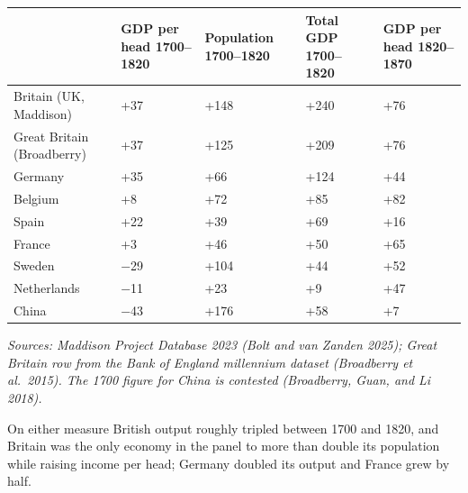 \documentclass[
  11pt,
]{article}
\newcounter{none} %
\begin{document}
{\def\LTcaptype{none} %
\begin{longtable}[]{@{}
  >{\raggedright\arraybackslash}p{}
  >{\raggedleft\arraybackslash}p{}
  >{\raggedleft\arraybackslash}p{}
  >{\raggedleft\arraybackslash}p{}
  >{\raggedleft\arraybackslash}p{}@{}}
\toprule\noalign{}
\begin{minipage}[b]{\linewidth}\raggedright
\end{minipage} & \begin{minipage}[b]{\linewidth}\raggedleft
GDP per head 1700--1820
\end{minipage} & \begin{minipage}[b]{\linewidth}\raggedleft
Population 1700--1820
\end{minipage} & \begin{minipage}[b]{\linewidth}\raggedleft
Total GDP 1700--1820
\end{minipage} & \begin{minipage}[b]{\linewidth}\raggedleft
GDP per head 1820--1870
\end{minipage} \\
\midrule\noalign{}
\endhead
\bottomrule\noalign{}
\endlastfoot
Britain (UK, Maddison) & +37 & +148 & +240 & +76 \\
Great Britain (Broadberry) & +37 & +125 & +209 & +76 \\
Germany & +35 & +66 & +124 & +44 \\
Belgium & +8 & +72 & +85 & +82 \\
Spain & +22 & +39 & +69 & +16 \\
France & +3 & +46 & +50 & +65 \\
Sweden & −29 & +104 & +44 & +52 \\
Netherlands & −11 & +23 & +9 & +47 \\
China & −43 & +176 & +58 & +7 \\
\end{longtable}
}

\emph{Sources: Maddison Project Database 2023 (Bolt and van Zanden
2025); Great Britain row from the Bank of England millennium dataset
(Broadberry et al.~2015). The 1700 figure for China is contested
(Broadberry, Guan, and Li 2018).}

On either measure British output roughly tripled between 1700 and 1820,
and Britain was the only economy in the panel to more than double its
population while raising income per head; Germany doubled its output and
France grew by half.
\end{document}
